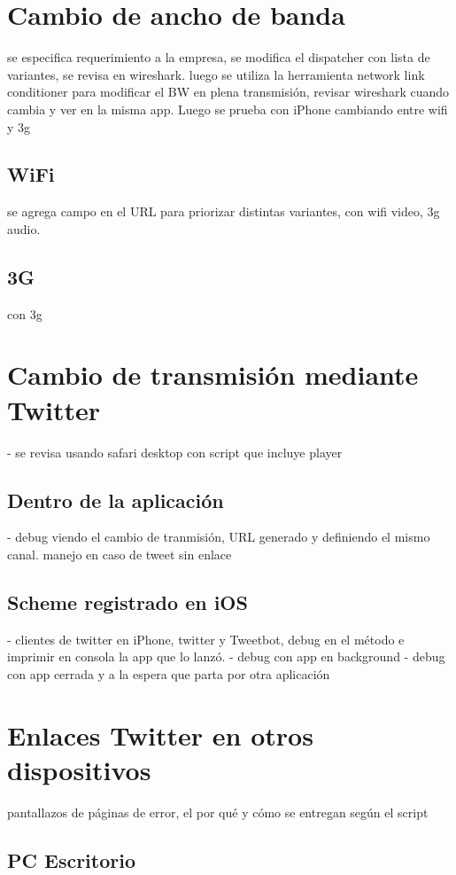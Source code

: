 \section{Cambio de ancho de banda}

se especifica requerimiento a la empresa, se modifica el dispatcher con lista de variantes, se revisa en wireshark.
luego se utiliza la herramienta network link conditioner para modificar el BW en plena transmisión, revisar wireshark cuando cambia y ver en la misma app.
Luego se prueba con iPhone cambiando entre wifi y 3g

  \subsection{WiFi}
  se agrega campo en el URL para priorizar distintas variantes, con wifi video, 3g audio.
  \subsection{3G}
  con 3g 
\section{Cambio de transmisión mediante Twitter}
- se revisa usando safari desktop con script que incluye player


  \subsection{Dentro de la aplicación}
	- debug viendo el cambio de tranmisión, URL generado y definiendo el mismo canal. manejo en caso de tweet sin enlace
  \subsection{Scheme registrado en iOS}
	- clientes de twitter en iPhone, twitter y Tweetbot, debug en el método e imprimir en consola la app que lo lanzó.  
	- debug con app en background
	- debug con app cerrada y a la espera que parta por otra aplicación
  
\section{Enlaces Twitter en otros dispositivos}
	pantallazos de páginas de error, el por qué y cómo se entregan según el script
  \subsection{PC Escritorio}
